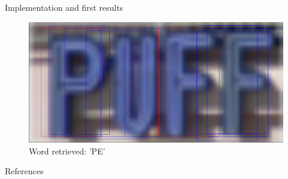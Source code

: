 \documentclass[handout]{beamer}
\begin{document}
\begin{frame}{Implementation and first results}
\begin{figure}%
\includegraphics[width=\columnwidth]{figures/puff.png}%
\caption{Word retrieved: 'PE'}%
\label{}%
\end{figure}
\end{frame}







\begin{frame}{References}
\tiny


\end{frame}
\end{document}
